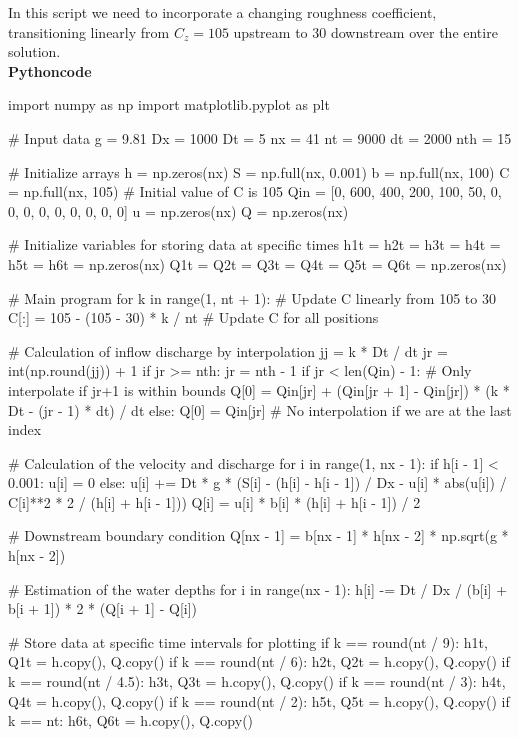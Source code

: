 \documentclass{article}
\begin{document}
\noindent
In this script we need to incorporate a changing roughness coefficient, transitioning linearly from \(C_z = 105\) upstream to 30 downstream over the entire solution.\\

\noindent
\textbf{Pythoncode}

\begin{ColoredVerbatim}[formatcom=\color{red}]
    import numpy as np
    import matplotlib.pyplot as plt
    
    # Input data
    g = 9.81
    Dx = 1000
    Dt = 5
    nx = 41
    nt = 9000
    dt = 2000
    nth = 15
    
    # Initialize arrays
    h = np.zeros(nx)
    S = np.full(nx, 0.001)
    b = np.full(nx, 100)
    C = np.full(nx, 105)  # Initial value of C is 105
    Qin = [0, 600, 400, 200, 100, 50, 0, 0, 0, 0, 0, 0, 0, 0, 0]
    u = np.zeros(nx)
    Q = np.zeros(nx)
    
    # Initialize variables for storing data at specific times
    h1t = h2t = h3t = h4t = h5t = h6t = np.zeros(nx)
    Q1t = Q2t = Q3t = Q4t = Q5t = Q6t = np.zeros(nx)
    
    # Main program
    for k in range(1, nt + 1):
        # Update C linearly from 105 to 30
        C[:] = 105 - (105 - 30) * k / nt  # Update C for all positions
        
        # Calculation of inflow discharge by interpolation
        jj = k * Dt / dt
        jr = int(np.round(jj)) + 1
        if jr >= nth:
            jr = nth - 1
        if jr < len(Qin) - 1:  # Only interpolate if jr+1 is within bounds
            Q[0] = Qin[jr] + (Qin[jr + 1] - Qin[jr]) * (k * Dt - (jr - 1) * dt) / dt
        else:
            Q[0] = Qin[jr]  # No interpolation if we are at the last index
        
        # Calculation of the velocity and discharge
        for i in range(1, nx - 1):
            if h[i - 1] < 0.001:
                u[i] = 0
            else:
                u[i] += Dt * g * (S[i] - (h[i] - h[i - 1]) / Dx - u[i] * abs(u[i]) / C[i]**2 * 2 / (h[i] + h[i - 1]))
                Q[i] = u[i] * b[i] * (h[i] + h[i - 1]) / 2
    
        # Downstream boundary condition
        Q[nx - 1] = b[nx - 1] * h[nx - 2] * np.sqrt(g * h[nx - 2])
    
        # Estimation of the water depths
        for i in range(nx - 1):
            h[i] -= Dt / Dx / (b[i] + b[i + 1]) * 2 * (Q[i + 1] - Q[i])
    
        # Store data at specific time intervals for plotting
        if k == round(nt / 9):
            h1t, Q1t = h.copy(), Q.copy()
        if k == round(nt / 6):
            h2t, Q2t = h.copy(), Q.copy()
        if k == round(nt / 4.5):
            h3t, Q3t = h.copy(), Q.copy()
        if k == round(nt / 3):
            h4t, Q4t = h.copy(), Q.copy()
        if k == round(nt / 2):
            h5t, Q5t = h.copy(), Q.copy()
        if k == nt:
            h6t, Q6t = h.copy(), Q.copy()
    

\end{ColoredVerbatim}
\end{document}
